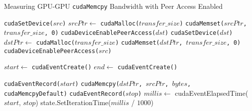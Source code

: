 
\begin{algorithm}[H]
	\caption[Measuring GPU-GPU \texttt{cudaMemcpy} Peer Bandwidth]{Measuring GPU-GPU \texttt{cudaMemcpy} Bandwidth with Peer Access Enabled}
	\label{alg:explicit-gpu-gpu}
	\begin{algorithmic}[1]
		\Statex
		\State \texttt{cudaSetDevice($src$)}
		\State $srcPtr \gets$ \texttt{cudaMalloc($transfer\_size$)} 
		\State \texttt{cudaMemset($srcPtr$, $transfer\_size$, 0)}
		\State \texttt{cudaDeviceEnablePeerAccess($dst$)}
		\State \texttt{cudaSetDevice($dst$)}
		\State $dstPtr \gets$ \texttt{cudaMalloc($transfer\_size$)} 
		\State \texttt{cudaMemset($dstPtr$, $transfer\_size$, 0)}
		\State \texttt{cudaDeviceEnablePeerAccess($src$)}
		
		\State $start \gets$ \texttt{cudaEventCreate()}
		\State $end \gets$ \texttt{cudaEventCreate()}

		\State \texttt{cudaEventRecord($start$)}
		\State \texttt{cudaMemcpy($dstPtr$, $srcPtr$, $bytes$, cudaMemcpyDefault)}
		\State \texttt{cudaEventRecord($stop$)}
		\State $millis \gets$ cudaEventElapsedTime($start$, $stop$)
		\State state.SetIterationTime($millis$ / $1000$)
        \EndFor
		
		\EndFunction
		
	\end{algorithmic}
\end{algorithm}

